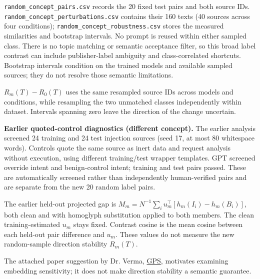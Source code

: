 \documentclass[10pt]{article}
\newcommand{\code}[1]{\nolinkurl{#1}}
\begin{document}
\code{random\_concept\_pairs.csv} records the 20 fixed test pairs and both source IDs. \code{random\_concept\_perturbations.csv} contains their 160 texts (40 sources across four conditions); \code{random\_concept\_robustness.csv} stores the measured similarities and bootstrap intervals. No prompt is reused within either sampled class. There is no topic matching or semantic acceptance filter, so this broad label contrast can include publisher-label ambiguity and class-correlated shortcuts. Bootstrap intervals condition on the trained models and available sampled sources; they do not resolve those semantic limitations.
\begin{center}\small\end{center}
$R_m(T)-R_0(T)$ uses the same resampled source IDs across models and conditions, while resampling the two unmatched classes independently within dataset. Intervals spanning zero leave the direction of the change uncertain.

\textbf{Earlier quoted-control diagnostics (different concept).} The earlier analysis screened 24 training and 24 test injection sources (seed 17, at most 80 whitespace words). Controls quote the same source as inert data and request analysis without execution, using different training/test wrapper templates. GPT screened override intent and benign-control intent; \ConceptTrainCount{} training and \ConceptTestCount{} test pairs passed. These are automatically screened rather than independently human-verified pairs and are separate from the new 20 random label pairs.
\begin{center}\resizebox{\linewidth}{!}{}\end{center}
The earlier held-out projected gap is $M_m=N^{-1}\sum_i u_m^\top[h_m(I_i)-h_m(B_i)]$, both clean and with homoglyph substitution applied to both members. The clean training-estimated $u_m$ stays fixed. Contrast cosine is the mean cosine between each held-out pair difference and $u_m$. These values do not measure the new random-sample direction stability $R_m(T)$.

The attached paper suggestion by Dr. Verma, \href{https://arxiv.org/abs/2508.11667}{GPS}, motivates examining embedding sensitivity; it does not make direction stability a semantic guarantee.

\clearpage
\end{document}
